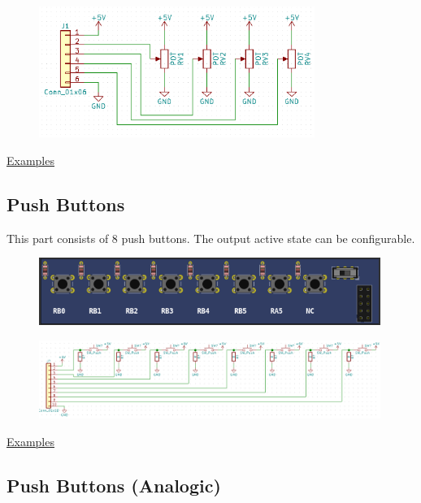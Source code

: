 \begin{figure}[H]
\center
\includegraphics[width=0.8\textwidth]{img/part_pot_.png} 
\end{figure} 

\href{https://lcgamboa.github.io/picsimlab_examples/examples/examples_index.html\#Potentiometers\_(Rotary)}{Examples}

\subsection{Push Buttons}

This part consists of 8 push buttons. The output active state can be configurable.
\begin{figure}[H]
\center
\includegraphics[width=0.99\textwidth]{img/part_buttons.png} 
\end{figure} 

\begin{figure}[H]
\center
\includegraphics[width=0.99\textwidth]{img/part_buttons_.png} 
\end{figure} 

\href{https://lcgamboa.github.io/picsimlab_examples/examples/examples_index.html\#Push\_buttons}{Examples}


\subsection{Push Buttons (Analogic)}


